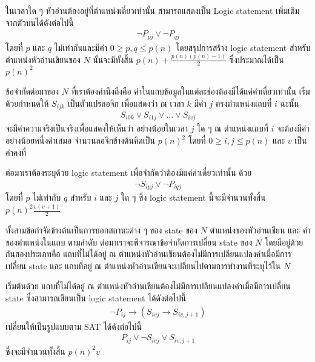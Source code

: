 \par{
ในเวลาใด ๆ หัวอ่านต้องอยู่ที่ตำแหน่งเดี่ยวเท่านั้น สามารถแสดงเป็น Logic statement เพิ่มเติมจากตัวบนได้ดังต่อไปนี้
%
\begin{eqnarray*}
\neg P_{pj} \vee \neg P_{qj} 
\end{eqnarray*}
%
โดยที่ $p$ และ $q$ ไม่เท่ากันและมีค่า $0 \ge p, q \le p(n)$ โดยสรุปการสร้าง logic statement สำหรับตำแหน่งหัวอ่านเขียนของ $N$ นั้นจะมีทั้งสิ้น $p(n) + \frac{p(n)(p(n)-1)}{2}$ ซึ่งประมาณได้เป็น $p(n)^2$ 
}

\par{
ข้อจำกัดต่อมาของ $N$ ที่เราต้องคำนึงถึงคือ ค่าในแถบข้อมูลในแต่ละช่องต้องมีได้แค่ค่าเดี่ยวเท่านั้น เริ่มด้วยกำหนดให้ $S_{ijk}$ เป็นตัวแปรลอจิก เพื่อแสดงว่า ณ เวลา $k$ มีค่า $j$ ตรงตำแหน่งแถบที่ $i$ ฉะนั้น
%
\begin{eqnarray*}
S_{i0k} \vee S_{i1j} \vee \ldots \vee S_{ivj} 
\end{eqnarray*}
%
จะมีค่าความจริงเป็นจริงเพื่อแสดงให้เห็นว่า อย่างน้อยในเวลา $j$ ใด ๆ ณ ตำแหน่งแถบที่ $i$ จะต้องมีค่าอย่างน้อยหนึ่งค่าเสมอ จำนวนลอจิกข้างต้นคิดเป็น $p(n)^2$ โดยที่ $0 \ge i, j \le p(n)$ และ $v$ เป็นค่าคงที่  
}

\par{
ต่อมาเราต้องระบุด้วย logic statement เพื่อจำกัดว่าต้องมีแค่ค่าเดี่ยวเท่านั้น ด้วย
%
\begin{eqnarray*}
\neg S_{ipj} \vee \neg P_{iqj} 
\end{eqnarray*}
%
โดยที่ $p$ ไม่เท่ากับ $q$ สำหรับ $i$ และ $j$ ใด ๆ ซึ่ง logic statement นี้จะมีจำนวนทั้งสิ้น $p(n)^2\frac{v(v+1)}{2}$
}

\par{
ทั้งสามข้อกำจัดข้างต้นเป็นการบอกสถานะต่าง ๆ ของ state ของ $N$ ตำแหน่งของหัวอ่านเชียน และ ค่าของตำแหน่งในแถบ ตามลำดับ ต่อมาเราจะพิจารณาข้อจำกัดการเปลี่ยน state ของ $N$ โดยมีอยู่ด้วยกันสองประเภทคือ แถบที่ไม่ได้อยู่ ณ ตำแหน่งหัวอ่านเชียนต้องไม่มีการเปลียนแปลงค่าเมื่อมีการเปลี่ยน state และ แถบที่อยู่ ณ ตำแหน่งหัวอ่านเขียนจะเปลี่ยนไปตามการทำงานที่ระบุไว้ใน $N$
}

\par{
เริ่มต้นด้วย แถบที่ไม่ได้อยู่ ณ ตำแหน่งหัวอ่านเชียนต้องไม่มีการเปลียนแปลงค่าเมื่อมีการเปลี่ยน state ซึ่งสามารถเขียนเป็น logic statement ได้ดังต่อไปนี้
%
\begin{eqnarray*}
\neg P_{ij} \rightarrow (S_{ivj} \rightarrow S_{iv,j+1})
\end{eqnarray*}
%
เปลี่ยนให้เป็นรูปแบบตาม SAT ได้ดังต่อไปนี้
%
\begin{eqnarray*}
P_{ij} \vee \neg S_{ivj} \vee S_{iv,j+1}
\end{eqnarray*}
%
ซึ่งจะมีจำนวนทั้งสิ้น $p(n)^2v$
}


